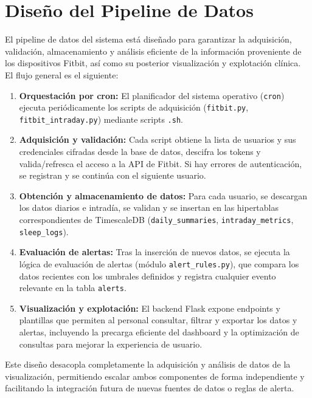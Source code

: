 \section{Diseño del Pipeline de Datos}
\label{sec:diseno_pipeline}

El pipeline de datos del sistema está diseñado para garantizar la adquisición, validación, almacenamiento y análisis eficiente de la información proveniente de los dispositivos Fitbit, así como su posterior visualización y explotación clínica. El flujo general es el siguiente:

\begin{enumerate}
    \item \textbf{Orquestación por cron:} El planificador del sistema operativo (\texttt{cron}) ejecuta periódicamente los scripts de adquisición (\texttt{fitbit.py}, \texttt{fitbit\_intraday.py}) mediante scripts \texttt{.sh}.
    \item \textbf{Adquisición y validación:} Cada script obtiene la lista de usuarios y sus credenciales cifradas desde la base de datos, descifra los tokens y valida/refresca el acceso a la API de Fitbit. Si hay errores de autenticación, se registran y se continúa con el siguiente usuario.
    \item \textbf{Obtención y almacenamiento de datos:} Para cada usuario, se descargan los datos diarios e intradía, se validan y se insertan en las hipertablas correspondientes de TimescaleDB (\texttt{daily\_summaries}, \texttt{intraday\_metrics}, \texttt{sleep\_logs}).
    \item \textbf{Evaluación de alertas:} Tras la inserción de nuevos datos, se ejecuta la lógica de evaluación de alertas (módulo \texttt{alert\_rules.py}), que compara los datos recientes con los umbrales definidos y registra cualquier evento relevante en la tabla \texttt{alerts}.
    \item \textbf{Visualización y explotación:} El backend Flask expone endpoints y plantillas que permiten al personal consultar, filtrar y exportar los datos y alertas, incluyendo la precarga eficiente del dashboard y la optimización de consultas para mejorar la experiencia de usuario.
\end{enumerate}

Este diseño desacopla completamente la adquisición y análisis de datos de la visualización, permitiendo escalar ambos componentes de forma independiente y facilitando la integración futura de nuevas fuentes de datos o reglas de alerta.

\vspace{0.5cm}

